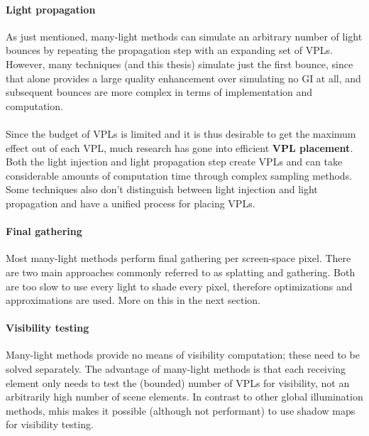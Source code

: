 \paragraph{Light propagation}
As just mentioned, many-light methods can simulate an arbitrary number of light bounces by repeating the propagation step with an expanding set of VPLs. However, many techniques (and this thesis) simulate just the first bounce, since that alone provides a large quality enhancement over simulating no GI at all, and subsequent bounces are more complex in terms of implementation and computation.
\\
\\
Since the budget of VPLs is limited and it is thus desirable to get the maximum effect out of each VPL, much research has gone into efficient \textbf{VPL placement}. Both the light injection and light propagation step create VPLs and can take considerable amounts of computation time through complex sampling methods. Some techniques also don't distinguish between light injection and light propagation and have a unified process for placing VPLs.

\paragraph{Final gathering}
Most many-light methods perform final gathering per screen-space pixel. There are two main approaches commonly referred to as splatting and gathering. Both are too slow to use every light to shade every pixel, therefore optimizations and approximations are used. More on this in the next section.

\paragraph{Visibility testing}
Many-light methods provide no means of visibility computation; these need to be solved separately. The advantage of many-light methods is that each receiving element only needs to test the (bounded) number of VPLs for visibility, not an arbitrarily high number of scene elements. In contrast to other global illumination methods, mhis makes it possible (although not performant) to use shadow maps for visibility testing.

